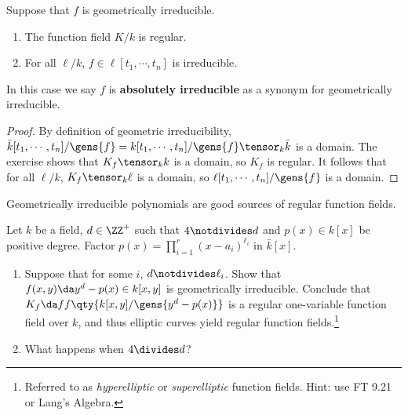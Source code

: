 \begin{proposition}[?]

Suppose that \(f\) is geometrically irreducible.

\begin{enumerate}
\def\labelenumi{\alph{enumi}.}
\item
  The function field \(K/k\) is regular.
\item
  For all \(\ell/k\), \(f\in \ell[t_1, \cdots, t_n]\) is irreducible.
\end{enumerate}

\end{proposition}

\begin{definition}

In this case we say \(f\) is \textbf{absolutely irreducible} as a
synonym for geometrically irreducible.

\end{definition}

\begin{proof}

By definition of geometric irreducibility,
\(\bar k[t_1, \cdots, t_n]/\gens{f} = k[t_1, \cdots, t_n]/\gens{f} \tensor_k \bar k\)
is a domain. The exercise shows that \(K_f \tensor_k k\) is a domain, so
\(K_f\) is regular. It follows that for all \(\ell/k\),
\(K_f \tensor_k \ell\) is a domain, so
\(\ell[t_1, \cdots, t_n]/\gens{f}\) is a domain.

\end{proof}

\begin{slogan}

Geometrically irreducible polynomials are good sources of regular
function fields.

\end{slogan}

\begin{exercise}

Let \(k\) be a field, \(d\in \ZZ^+\) such that \(4\notdivides d\) and
\(p(x) \in k[x]\) be positive degree. Factor
\(p(x) = \prod_{i=1}^r (x-a_i)^{\ell_i}\) in \(\bar k[x]\).

\begin{enumerate}
\def\labelenumi{\alph{enumi}.}
\item
  Suppose that for some \(i\), \(d\notdivides \ell_i\). Show that
  \(f(x, y) \da y^d - p(x) \in k[x, y]\) is geometrically irreducible.
  Conclude that \(K_f \da ff\qty{k[x, y] / \gens{y^d - p(x)}}\) is a
  regular one-variable function field over \(k\), and thus elliptic
  curves yield regular function fields.\footnote{Referred to as
    \emph{hyperelliptic} or \emph{superelliptic} function fields. Hint:
    use FT 9.21 or Lang's Algebra.}
\item
  What happens when \(4\divides d\)?
\end{enumerate}

\end{exercise}

